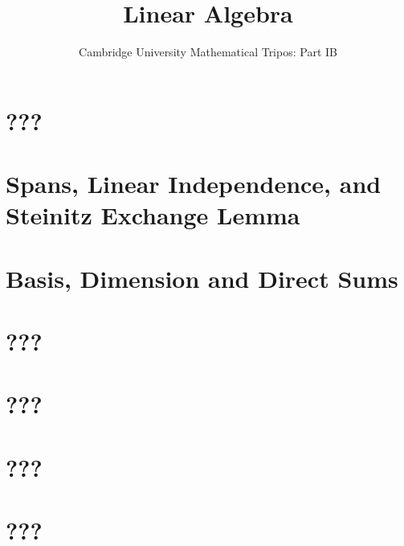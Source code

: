 \documentclass{article}
\title{Linear Algebra}
\author{Cambridge University Mathematical Tripos: Part IB}
\begin{document}
\maketitle

\tableofcontentsnewpage{}

\section{???}

\section{Spans, Linear Independence, and Steinitz Exchange Lemma}

\section{Basis, Dimension and Direct Sums}

\section{???}

\section{???}

\section{???}

\section{???}

\end{document}
